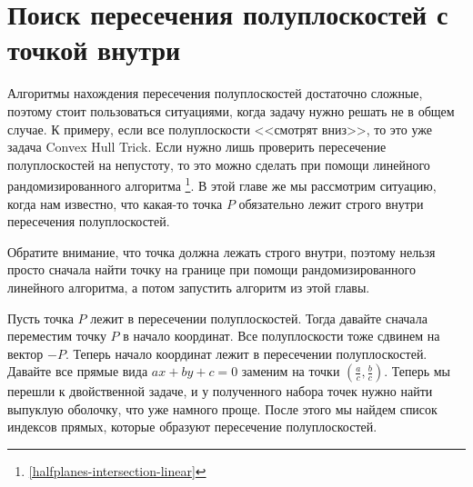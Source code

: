 \chapter{Поиск пересечения полуплоскостей с точкой внутри} \label{halfplanes-intersection-point-inside}

Алгоритмы нахождения пересечения полуплоскостей достаточно сложные, поэтому стоит пользоваться ситуациями, когда задачу нужно решать не в общем случае. К примеру, если все полуплоскости <<смотрят вниз>>, то это уже задача Convex Hull Trick. Если нужно лишь проверить пересечение полуплоскостей на непустоту, то это можно сделать при помощи линейного рандомизированного алгоритма \footnote{\ref{halfplanes-intersection-linear}}. В этой главе же мы рассмотрим ситуацию, когда нам известно, что какая-то точка $P$ обязательно лежит строго внутри пересечения полуплоскостей.

\begin{observation}
    Обратите внимание, что точка должна лежать строго внутри, поэтому нельзя просто сначала найти точку на границе при помощи рандомизированного линейного алгоритма, а потом запустить алгоритм из этой главы. 
\end{observation}

Пусть точка $P$ лежит в пересечении полуплоскостей. Тогда давайте сначала переместим точку $P$ в начало координат. Все полуплоскости тоже сдвинем на вектор $-P$. Теперь начало координат лежит в пересечении полуплоскостей. Давайте все прямые вида $ax + by + c = 0$ заменим на точки $\left( \frac{a}{c}, \frac{b}{c} \right)$. Теперь мы перешли к двойственной задаче, и у полученного набора точек нужно найти выпуклую оболочку, что уже намного проще. После этого мы найдем список индексов прямых, которые образуют пересечение полуплоскостей.
